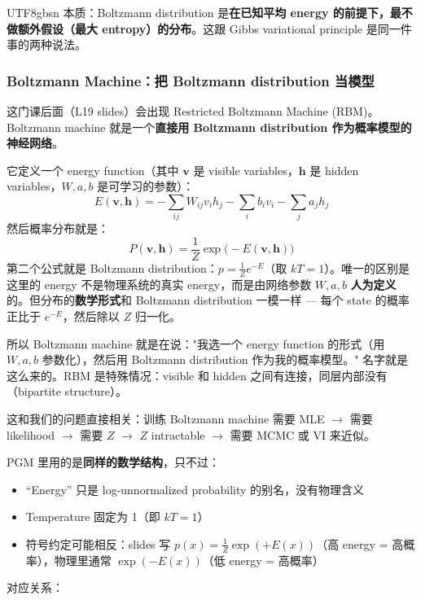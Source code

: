 \documentclass[11pt]{article}
\begin{document}
\begin{CJK}{UTF8}{gbsn}
本质：Boltzmann distribution 是\textbf{在已知平均 energy 的前提下，最不做额外假设（最大 entropy）的分布}。这跟 Gibbs variational principle 是同一件事的两种说法。

\subsubsection{Boltzmann Machine：把 Boltzmann distribution 当模型}

这门课后面（L19 slides）会出现 Restricted Boltzmann Machine (RBM)。Boltzmann machine 就是一个\textbf{直接用 Boltzmann distribution 作为概率模型的神经网络}。

它定义一个 energy function（其中 $\mathbf{v}$ 是 visible variables，$\mathbf{h}$ 是 hidden variables，$W, a, b$ 是可学习的参数）：
\[
  E(\mathbf{v}, \mathbf{h}) = -\sum_{ij} W_{ij} v_i h_j - \sum_i b_i v_i - \sum_j a_j h_j
\]
然后概率分布就是：
\[
  P(\mathbf{v}, \mathbf{h}) = \frac{1}{Z} \exp\!\big(-E(\mathbf{v}, \mathbf{h})\big)
\]
第二个公式就是 Boltzmann distribution：$p = \frac{1}{Z}e^{-E}$（取 $kT=1$）。唯一的区别是这里的 energy 不是物理系统的真实 energy，而是由网络参数 $W, a, b$ \textbf{人为定义}的。但分布的\textbf{数学形式}和 Boltzmann distribution 一模一样 --- 每个 state 的概率正比于 $e^{-E}$，然后除以 $Z$ 归一化。

所以 Boltzmann machine 就是在说："我选一个 energy function 的形式（用 $W, a, b$ 参数化），然后用 Boltzmann distribution 作为我的概率模型。" 名字就是这么来的。RBM 是特殊情况：visible 和 hidden 之间有连接，同层内部没有（bipartite structure）。

这和我们的问题直接相关：训练 Boltzmann machine 需要 MLE $\to$ 需要 likelihood $\to$ 需要 $Z$ $\to$ $Z$ intractable $\to$ 需要 MCMC 或 VI 来近似。

PGM 里用的是\textbf{同样的数学结构}，只不过：
\begin{itemize}
  \item ``Energy'' 只是 log-unnormalized probability 的别名，没有物理含义
  \item Temperature 固定为 1（即 $kT = 1$）
  \item 符号约定可能相反：slides 写 $p(x) = \frac{1}{Z}\exp(+E(x))$（高 energy = 高概率），物理里通常 $\exp(-E(x))$（低 energy = 高概率）
\end{itemize}

\noindent 对应关系：


\end{CJK}
\end{document}
